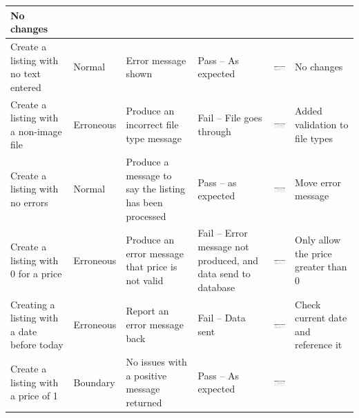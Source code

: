 \begin{center}
\begin{longtable}{|P{17mm}|P{17mm}|P{16mm}|P{17mm}|P{40mm}|P{21.5mm}|}
No changes \\ \hline
Create a listing with no text entered & Normal & Error message shown &
Pass -- As expected &
\includegraphics[width=38mm]{ch3_developing/proto2/media/image9.png} &
No changes \\ \hline
Create a listing with a non-image file & Erroneous & Produce an
incorrect file type message & Fail -- File goes through &
\includegraphics[width=38mm]{ch3_developing/proto2/media/image10.png}
& Added validation to file types \\ \hline
Create a listing with no errors & Normal & Produce a message to say the
listing has been processed & Pass -- as expected &
\includegraphics[width=38mm]{ch3_developing/proto2/media/image11.png}
& Move error message \\ \hline
Create a listing with 0 for a price & Erroneous & Produce an error
message that price is not valid & Fail -- Error message not produced,
and data send to database &
\includegraphics[width=38mm]{ch3_developing/proto2/media/image12.png}
& Only allow the price greater than 0 \\ \hline
Creating a listing with a date before today & Erroneous & Report an
error message back & Fail -- Data sent &
\includegraphics[width=38mm]{ch3_developing/proto2/media/image12.png}
& Check current date and reference it \\ \hline
Create a listing with a price of 1 & Boundary & No issues with a
positive message returned & Pass -- As expected &
\includegraphics[width=38mm]{ch3_developing/proto2/media/image11.png}

\end{longtable}
\end{center}
